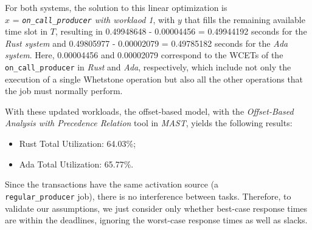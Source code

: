 \label{lab:optimization-problem-model}
For both systems, the solution to this linear optimization is \\
$x$ = \textit{\texttt{on\_call\_producer} with worklaod 1}, with $y$ that fills
the remaining available time slot in $T$, resulting in 0.49948648 - 0.00004456 =
0.49944192 seconds for the \textit{Rust system} and 0.49805977 - 0.00002079 =
0.49785182 seconds for the \textit{Ada system}. Here, 0.00004456 and 0.00002079
correspond to the WCETs of the \texttt{on\_call\_producer} in \textit{Rust} and
\textit{Ada}, respectively, which include not only the execution of a single
Whetstone operation but also all the other operations that the job must normally
perform.  

With these updated workloads, the offset-based model, with the \textit{Offset-Based
Analysis with Precedence Relation} tool in \textit{MAST}, yields the following
results:
\begin{itemize}
  \item Rust Total Utilization: 64.03\%;
  \item Ada Total Utilization: 65.77\%. 
\end{itemize}
Since the transactions have the same activation source (a \\
\texttt{regular\_producer} job), there is no interference between tasks.
Therefore, to validate our assumptions, we just consider only whether best-case
response times are within the deadlines, ignoring the worst-case response times
as well as slacks. 